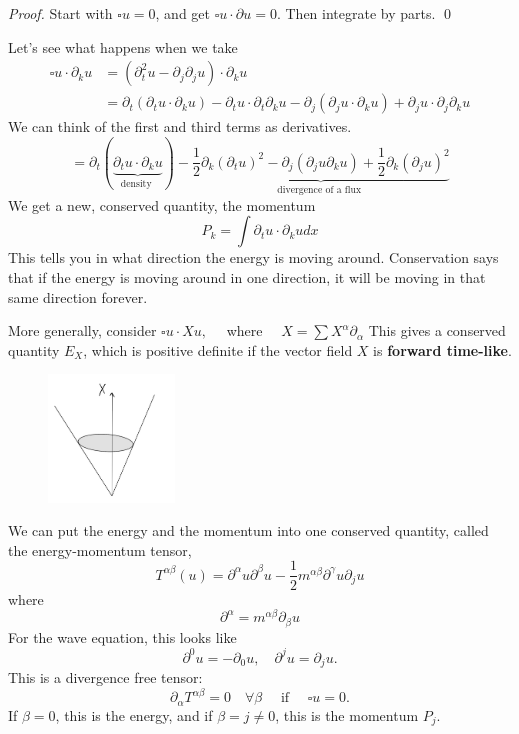 \vspace{1em}
\begin{proof}
    Start with $\square u=0$, and get $\square u \cdot \partial u=0$. Then integrate by parts.
    \qed
\end{proof}

Let's see what happens when we take
$$
\begin{aligned}
\square u \cdot \partial_{k} u &=\left(\partial_{t}^{2} u-\partial_{j} \partial_{j} u\right) \cdot \partial_{k} u \\
&=\partial_{t}\left(\partial_{t} u \cdot \partial_{k} u\right)-\partial_{t} u \cdot \partial_{t} \partial_{k} u-\partial_{j}\left(\partial_{j} u \cdot \partial_{k} u\right)+\partial_{j} u \cdot \partial_{j} \partial_{k} u
\end{aligned}
$$
We can think of the first and third terms as derivatives.
$$
=\partial_{t}(\underbrace{\partial_{t} u \cdot \partial_{k} u}_{\text {density }})-\underbrace{\frac{1}{2} \partial_{k}\left(\partial_{t} u\right)^{2}-\partial_{j}\left(\partial_{j} u \partial_{k} u\right)+\frac{1}{2} \partial_{k}\left(\partial_{j} u\right)^{2}}_{\text {divergence of a flux }}
$$
We get a new, conserved quantity, the momentum
$$
P_{k}=\int \partial_{t} u \cdot \partial_{k} u d x
$$
This tells you in what direction the energy is moving around. Conservation says that if the energy is moving around in one direction, it will be moving in that same direction forever.

More generally, consider
$\square u \cdot X u, \quad$ where $\quad X=\sum X^{\alpha} \partial_{\alpha}$
This gives a conserved quantity $E_{X}$, which is positive definite if the vector field $X$ is \textbf{forward time-like}.

\begin{figure}[H]
    \centering
    \includegraphics[width=0.3\textwidth]{pics/25-6.png}
\end{figure}

\begin{remark}
    We can put the energy and the momentum into one conserved quantity, called the energy-momentum tensor,
$$
T^{\alpha \beta}(u)=\partial^{\alpha} u \partial^{\beta} u-\frac{1}{2} m^{\alpha \beta} \partial^{\gamma} u \partial_{j} u
$$
where
$$
\partial^{\alpha}=m^{\alpha \beta} \partial_{\beta} u
$$
For the wave equation, this looks like
$$
\partial^{0} u=-\partial_{0} u, \quad \partial^{j} u=\partial_{j} u .
$$
This is a divergence free tensor:
$$
\partial_{\alpha} T^{\alpha \beta}=0 \quad \forall \beta \quad \text { if } \quad \square u=0 .
$$
If $\beta=0$, this is the energy, and if $\beta=j \neq 0$, this is the momentum $P_{j}$.
\end{remark}

